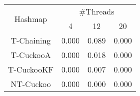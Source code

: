 \begin{tabular}{|c|c|c|c|}
\hline
\multirow{2}{*}{Hashmap} & \multicolumn{3}{c|}{\#Threads}\\\cline{2-4}& 4 & 12 & 20\\
\hline
\hline
T-Chaining & 0.000 & 0.089 & 0.000\\
T-CuckooA & 0.000 & 0.018 & 0.000\\
T-CuckooKF & 0.000 & 0.007 & 0.000\\
NT-Cuckoo & 0.000 & 0.000 & 0.000\\
\hline
\end{tabular}
